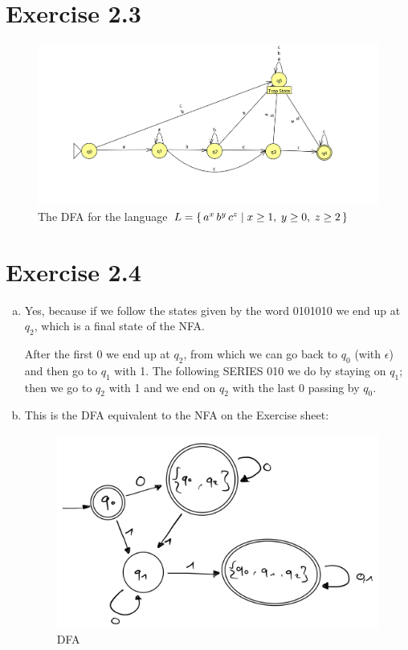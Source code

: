 \documentclass{article} %
\newcommand{\homeworkNumber}{2}
\begin{document}
\section*{Exercise \homeworkNumber.3}
\begin{figure}[H]
	\includegraphics[width=\linewidth]{ex3.png}
	\centering
	\caption{The DFA for the language $L = \set{a^x \, b^y \, c^z \mid x \ge 1,\; y \ge 0,\; z \ge 2}$}
\end{figure}

\clearpage

\section*{Exercise \homeworkNumber.4}
\begin{enumerate}[(a)]
	\item
	Yes, because if we follow the states given by the word 0101010 we end up at
	$q_2$, which is a final state of the NFA.
	
	After the first 0 we end up at $q_2$, from which we can go back to $q_0$ (with $\epsilon$) and then
	go to $q_1$ with 1. The following SERIES 010 we do by staying on $q_1$; then we go to $q_2$ with 1
	and we end on $q_2$ with the last 0 passing by $q_0$.

	\item
	This is the DFA equivalent to the NFA on the Exercise sheet:
	\begin{figure}[H]
		\includegraphics[width=\linewidth]{ex4b.png}
		\centering
		\caption{DFA}
	\end{figure}
\end{enumerate}
\end{document}
